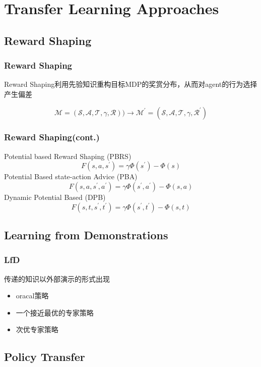 \documentclass[aspectratio=169]{beamer}
\begin{document}
\section{Transfer Learning Approaches}

\subsection{Reward Shaping}

\begin{frame}
  \frametitle{Reward Shaping}
  Reward Shaping利用先验知识重构目标MDP的奖赏分布，从而对agent的行为选择产生偏差

  $$
  \mathcal{M}=(\mathcal{S}, \mathcal{A}, \mathcal{T}, \gamma, \mathcal{R})) \rightarrow \mathcal{M}^{\prime}=\left(\mathcal{S}, \mathcal{A}, \mathcal{T}, \gamma, \mathcal{R}^{\prime}\right)
  $$
  
\end{frame}

\begin{frame}
  \frametitle{Reward Shaping(cont.)}
  Potential based Reward Shaping (PBRS)
  $$
  F\left(s, a, s^{\prime}\right)=\gamma \Phi\left(s^{\prime}\right)-\Phi(s)
  $$
  Potential Based state-action Advice (PBA)
  $$
  F\left(s, a, s^{\prime}, a^{\prime}\right)=\gamma \Phi\left(s^{\prime}, a^{\prime}\right)-\Phi(s, a)
  $$
  Dynamic Potential Based (DPB)
  $$
  F\left(s, t, s^{\prime}, t^{\prime}\right)=\gamma \Phi\left(s^{\prime}, t^{\prime}\right)-\Phi(s, t)
  $$

\end{frame}
\subsection{Learning from Demonstrations}

\begin{frame}
  \frametitle{LfD}
  传递的知识以外部演示的形式出现
  \begin{itemize}
    \item oracal策略
    \item 一个接近最优的专家策略
    \item 次优专家策略
  \end{itemize}
\end{frame}

\subsection{Policy Transfer}
\end{document}
